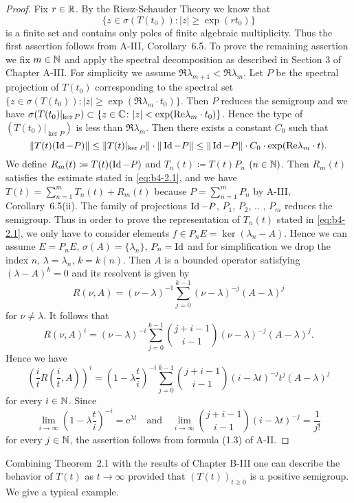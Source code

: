 \begin{proof}
	Fix $r \in \mathbb{R}$.
	By the Riesz-Schauder Theory we know that
	\[
    \{z \in \sigma(T(t_{0})) \colon |z| \geq \exp(rt_{0})\}
    \]
    is a finite set and contains only
	poles of finite algebraic multiplicity.
	Thus the first assertion
	follows from A-III, Corollary~6.5.
	To prove the remaining assertion we fix $m \in \mathbb{N}$ and apply the spectral
	decomposition as described in Section 3 of Chapter A-III.
	For simplicity we assume $\Re \lambda_{m+1} < \Re   \lambda_m$.
	Let $P$ be the spectral projection
	of $T(t_{0})$ corresponding to the spectral set $\{z \in \sigma(T(t_{0})) :
	|z| \geq \exp(\Re \lambda_m \cdot t_{0})\}$.
	Then $P$ reduces the semigroup and we have
	$\sigma(T(t_{0})|_{\ker P}) \subset \{z \in \mathbb{C} \colon |z| < \exp(\mathop{}\!\mathrm{Re} \lambda_m \cdot t_{0})\}$.
	Hence the type of
	$(T(t_{0})|_{\ker P})$ is less than $\Re \lambda_m$.
	Then there exists a constant $C_{0}$
	such that
\[
\|T(t)(\operatorname{Id} -P)\| \leq \|T(t)|_{\ker P}\|\cdot\|\operatorname{Id} -P\| \leq \|\operatorname{Id} -P\|\cdot C_{0} \cdot \exp(\mathop{}\!\mathrm{Re} \lambda_m \cdot t) .
\]
We define $R_m(t)  \coloneq  T(t)(\operatorname{Id} -P)$ and $T_n(t)  \coloneq  T(t)P_n$ $(n \in \mathbb{N})$.
Then $R_m(t)$ satisfies the estimate stated in \eqref{eq:b4-2.1}, and we have $T(t) =
\sum_{n=1}^m T_n(t) + R_m(t)$ because $P = \sum_{n=1}^m P_n$ by A-III, Corollary~6.5(ii).
The family of projections $\operatorname{Id} -P$, $P_1$, $P_2$, .. , $P_m$ reduces the semigroup.
Thus in order to prove the representation of $T_n(t)$ stated in
\eqref{eq:b4-2.1}, we only have to consider elements $f \in P_n E = \ker(\lambda_n-A)$.
Hence we can assume $E = P_n E$, $\sigma(A) = \{\lambda_n\}$, $P_n = \operatorname{Id} $ and for simplification
we drop the index $n$, \ie  $\lambda = \lambda_n$, $k = k(n)$.
Then $A$ is a bounded operator satisfying $(\lambda - A)^k = 0$ and its resolvent is given by
%
\[
	R(\nu,A) = (\nu-\lambda)^{-1}\sum_{j=0}^{k-1}(\nu-\lambda)^{-j}(A-\lambda)^j
\]
%
for $\nu \neq \lambda$.
It follows that
%
\[
	 R(\nu,A)^i = (\nu-\lambda)^{-i}\sum_{j=0}^{k-1}\binom{j+i-1}{i-1}(\nu-\lambda)^{-j}(A-\lambda)^j .
\]
%
Hence we have
%
\[
	(\frac{i}{t}R(\frac{i}{t},A))^i = (1-\lambda\frac{t}{i})^{-i}\sum_{j=0}^{k-1}\binom{j+i-1}{i-1}(i-\lambda t)^{-j}t^j(A-\lambda)^j 
\]
%
for every $i \in \mathbb{N}$.
Since 
%
\[
	 \lim_{i\to\infty}(1-\lambda\frac{t}{i})^{-i} = \mathrm{e}^{\lambda t}
	 \quad \text{and} \quad \lim_{i\to\infty}\binom{j+i-1}{i-1}(i-\lambda t)^{-j} = \frac{1}{j!}
\]
%
for every $j \in \mathbb{N}$, the assertion follows from formula (1.3) of A-II.
\end{proof}
Combining Theorem~2.1 with the results of Chapter B-III one can describe
the behavior of $T(t)$ as $t \to \infty$ provided that $(T(t))_{t \geq 0}$ is a
positive semigroup.
We give a typical example.

